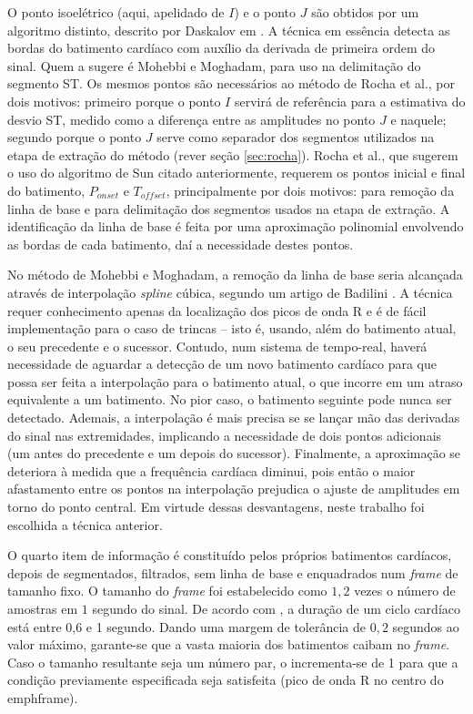 O ponto isoelétrico (aqui, apelidado de $I$) e o ponto $J$ são obtidos por um algoritmo distinto, descrito por Daskalov em \cite{Daskalov1998}. A técnica em essência detecta as bordas do batimento cardíaco com auxílio da derivada de primeira ordem do sinal. Quem a sugere é Mohebbi e Moghadam, para uso na delimitação do segmento ST. Os mesmos pontos são necessários ao método de Rocha et al., por dois motivos: primeiro porque o ponto $I$ servirá de referência para a estimativa do desvio ST, medido como a diferença entre as amplitudes no ponto $J$ e naquele; segundo porque o ponto $J$ serve como separador dos segmentos utilizados na etapa de extração do método (rever seção \ref{sec:rocha}). Rocha et al., que sugerem o uso do algoritmo de Sun citado anteriormente, requerem os pontos inicial e final do batimento, $P_{onset}$ e $T_{offset}$, principalmente por dois motivos: para remoção da linha de base e para delimitação dos segmentos usados na etapa de extração. A identificação da linha de base é feita por uma aproximação polinomial envolvendo as bordas de cada batimento, daí a necessidade destes pontos.

No método de Mohebbi e Moghadam, a remoção da linha de base seria alcançada através de interpolação \emph{spline} cúbica, segundo um artigo de Badilini \cite{Badilini1991}. A técnica requer conhecimento apenas da localização dos picos de onda R e é de fácil implementação para o caso de trincas -- isto é, usando, além do batimento atual, o seu precedente e o sucessor. Contudo, num sistema de tempo-real, haverá necessidade de aguardar a detecção de um novo batimento cardíaco para que possa ser feita a interpolação para o batimento atual, o que incorre em um atraso equivalente a um batimento. No pior caso, o batimento seguinte pode nunca ser detectado. Ademais, a interpolação é mais precisa se se lançar mão das derivadas do sinal nas extremidades, implicando a necessidade de dois pontos adicionais (um antes do precedente e um depois do sucessor). Finalmente, a aproximação se deteriora à medida que a frequência cardíaca diminui, pois então o maior afastamento entre os pontos na interpolação prejudica o ajuste de amplitudes em torno do ponto central. Em virtude dessas desvantagens, neste trabalho foi escolhida a técnica anterior.

O quarto item de informação é constituído pelos próprios batimentos cardíacos, depois de segmentados, filtrados, sem linha de base e enquadrados num \emph{frame} de tamanho fixo. O tamanho do \emph{frame} foi estabelecido como $1,2$ vezes o número de amostras em $1$ segundo do sinal. De acordo com \cite{Clifford2006}, a duração de um ciclo cardíaco está entre 0,6 e 1 segundo. Dando uma margem de tolerância de $0,2$ segundos ao valor máximo, garante-se que a vasta maioria dos batimentos caibam no \emph{frame}. Caso o tamanho resultante seja um número par, o incrementa-se de 1 para que a condição previamente especificada seja satisfeita (pico de onda R no centro do emph{frame}).

